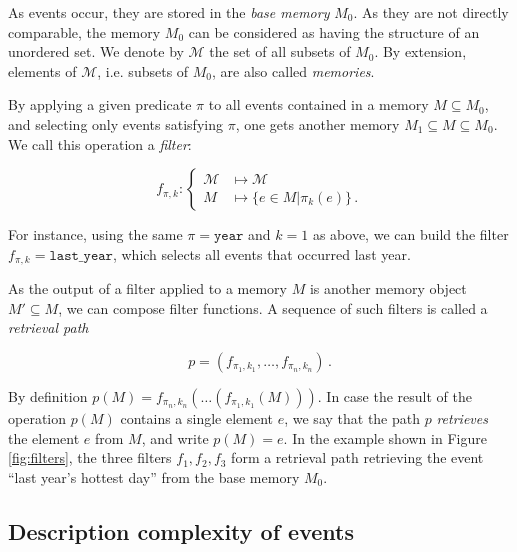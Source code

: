 \documentclass[entropy,article,submit,moreauthors,pdftex]{Definitions/mdpi}
\begin{document}
As events occur, they are stored in the  \emph{base memory} $M_0$. As they are not directly comparable, the memory $M_0$ can be considered as having the structure of an unordered set. We denote by $\mathcal{M}$ the set of all subsets of $M_0$. By extension, elements of $\mathcal{M}$, i.e. subsets of $M_0$, are also called \emph{memories}.

By applying a given predicate $\pi$ to all events contained in a memory $M \subseteq M_0$, and selecting only events satisfying $\pi$, one gets another memory $M_1 \subseteq M \subseteq M_0$. We call this operation a \emph{filter}:

\begin{equation}
    \label{eq:filter}
    f_{\pi, k}: \begin{cases}
        \mathcal{M} & \mapsto \mathcal{M}           \\
        M           & \mapsto \{e \in M | \pi_k(e) \}\,.
    \end{cases}
\end{equation}

For instance, using the same $\pi = \mathtt{year}$ and $k=1$ as above, we can
build the filter $f_{\pi, k} = \mathtt{last\_{}year}$, which selects all events
that occurred last year.

As the output of a filter applied to a memory $M$ is another memory
object $M' \subseteq M$, we can compose filter
functions. A sequence of such filters is called a \emph{retrieval path}

\begin{equation}
    \label{eq:ret_def}
    p = (f_{\pi_{1}, k_{1}}, \dots, f_{\pi_{n}, k_{n}})\,.
\end{equation}

By definition
$p(M) = f_{\pi_{n}, k_{n}}(\dots(f_{\pi_{1}, k_{1}}(M)))$.
In case the result of the operation $p(M)$ contains a single element
$e$, we say that the path $p$ \emph{retrieves} the element $e$ from $M$, and write
$p(M) = e$. In the example shown in Figure \ref{fig:filters}, the three filters $f_1, f_2, f_3$ form a retrieval path retrieving the event ``last year's hottest day'' from the base memory $M_0$.

\subsection{Description complexity of events}
\end{document}
